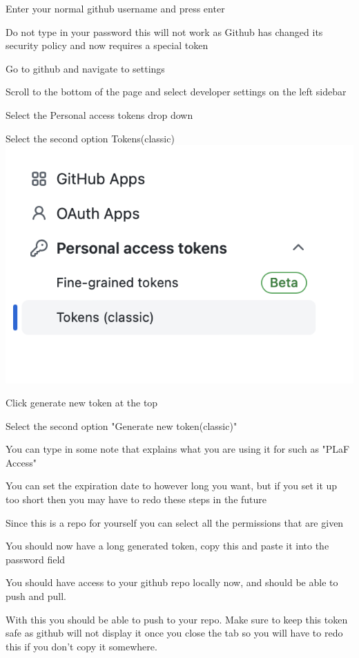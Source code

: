 \documentclass{article}
\newcommand{\SubItem}[1]{
    {\setlength\itemindent{15pt} \item[-] #1}
}
\begin{document}
\begin{enumerate}
    \item Enter your normal github username and press enter
    \SubItem{Do not type in your password this will not work as Github has changed its security policy and now requires a special token}
    \item Go to github and navigate to settings
    \item Scroll to the bottom of the page and select developer settings on the left sidebar \\
    \item Select the Personal access tokens drop down
    \item Select the second option Tokens(classic) \\
    \includegraphics[width=.5\textwidth]{images/tokens.png} 
    \item Click generate new token at the top
    \item Select the second option "Generate new token(classic)"
    \item You can type in some note that explains what you are using it for such as "PLaF Access"
    \item You can set the expiration date to however long you want, but if you set it up too short then you may have to redo these steps in the future
    \item Since this is a repo for yourself you can select all the permissions that are given
    \item You should now have a long generated token, copy this and paste it into the password field
    \item You should have access to your github repo locally now, and should be able to push and pull.
\end{enumerate}

\noindent
With this you should be able to push to your repo. Make sure to keep this token safe as github will not display it once you close the tab so you will have to redo this if you don't copy it somewhere.
\end{document}
